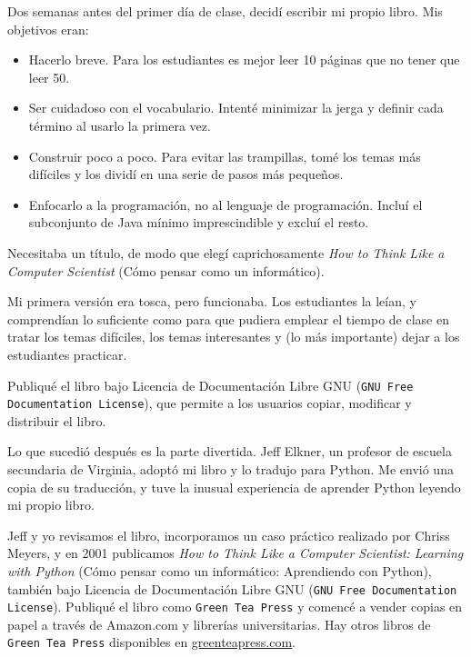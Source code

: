 Dos semanas antes del primer día de clase, decidí escribir mi
propio libro.
Mis objetivos eran:

\begin{itemize}

\item Hacerlo breve. Para los estudiantes es mejor leer 10 páginas
que no tener que leer 50.

\item Ser cuidadoso con el vocabulario. Intenté minimizar la jerga
y definir cada término al usarlo la primera vez.

\item Construir poco a poco. Para evitar las trampillas, tomé los temas
más difíciles y los dividí en una serie de pasos más pequeños.

\item Enfocarlo a la programación, no al lenguaje de programación. Incluí
el subconjunto de Java mínimo imprescindible y excluí el resto.

\end{itemize}

Necesitaba un título, de modo que elegí caprichosamente \emph{How to Think Like
a Computer Scientist} (Cómo pensar como un informático).

Mi primera versión era tosca, pero funcionaba. Los estudiantes la leían,
y comprendían lo suficiente como para que pudiera emplear el tiempo de clase
en tratar los temas difíciles, los temas interesantes y (lo más importante) dejar a los
estudiantes practicar.

Publiqué el libro bajo Licencia de Documentación Libre GNU ({\tt GNU Free Documentation License}),
que permite a los usuarios copiar, modificar y distribuir el libro.


Lo que sucedió después es la parte divertida. Jeff Elkner, un profesor
de escuela secundaria de Virginia, adoptó mi libro y lo tradujo para
Python. Me envió una copia de su traducción, y tuve la inusual
experiencia de aprender Python leyendo mi propio libro.

Jeff y yo revisamos el libro, incorporamos un caso práctico realizado por
Chriss Meyers, y en 2001 publicamos \emph{How to Think Like
a Computer Scientist: Learning with Python} (Cómo pensar como un informático:
Aprendiendo con Python), también bajo
Licencia de Documentación Libre GNU ({\tt GNU Free Documentation License}).
Publiqué el libro como {\tt Green Tea Press} y comencé a vender
copias en papel a través de Amazon.com y librerías universitarias.
Hay otros libros de {\tt Green Tea Press} disponibles en
\url{greenteapress.com}.

